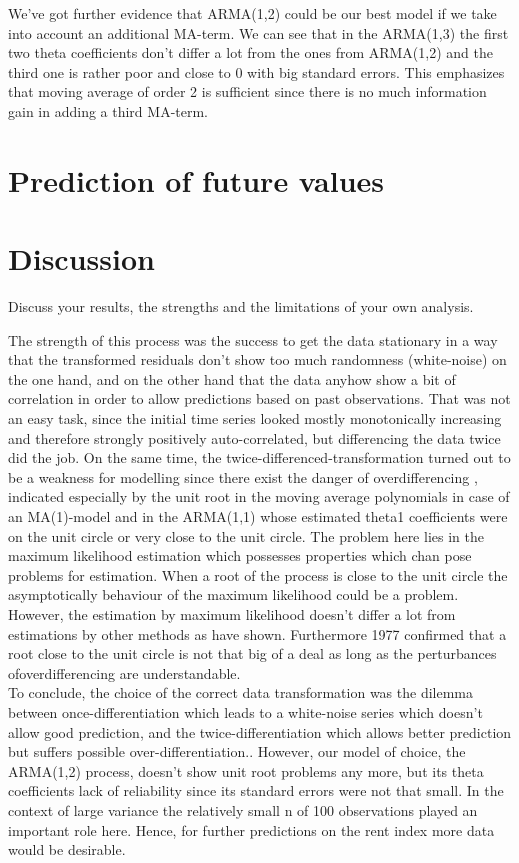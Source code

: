 \documentclass[11pt,a4paper]{article}
\begin{document}
We've got further evidence that ARMA(1,2) could be our best model if we take into account an additional MA-term. We can see that in the ARMA(1,3) the first two theta coefficients don't differ a lot from the ones  from ARMA(1,2) and the third one is rather poor and close to 0 with big standard errors. This emphasizes that moving average of order 2 is sufficient since there is no much information gain in adding a third MA-term.

\section{Prediction of future values}

\section{Discussion}
Discuss your results, the strengths and the limitations of your own analysis. 

The strength of this process was the success to get the data stationary in a way that the transformed residuals don't show too much randomness (white-noise) on the one hand, and on the other hand that the data anyhow show a bit of correlation in order to allow predictions based on past observations. That was not an easy task, since the initial time series looked mostly monotonically increasing and therefore strongly positively auto-correlated, but differencing the data twice did the job. On the same time, the twice-differenced-transformation turned out to be a weakness for modelling since there exist the danger of overdifferencing \cite[~p.194]{bd02}, indicated especially by the unit root in the moving average polynomials in case of an MA(1)-model and in the ARMA(1,1) whose estimated theta1 coefficients were on the unit circle or very close to the unit circle. The problem here lies in the maximum likelihood estimation which possesses properties which chan pose problems for estimation\citep{davidson81}. When a root of the process is close to the unit circle the asymptotically behaviour of the maximum likelihood could be a problem. However, the estimation by maximum likelihood doesn't differ a lot from estimations by other methods as  \citep{davisdunsmuir96} have shown. Furthermore 1977 confirmed that a root close to the unit circle is not that big of a deal as long as the perturbances ofoverdifferencing are understandable.\\ 
To conclude, the choice of the correct data transformation was the dilemma between once-differentiation which leads to a white-noise series which doesn't allow good prediction, and the twice-differentiation which allows better prediction but suffers possible over-differentiation..
However, our model of choice, the ARMA(1,2) process, doesn't show unit root problems any more, but its theta coefficients lack of reliability since its standard errors were not that small. In the context of large variance the relatively small n of 100 observations played an important role here. Hence, for further predictions on the rent index more data would be desirable.
\end{document}
